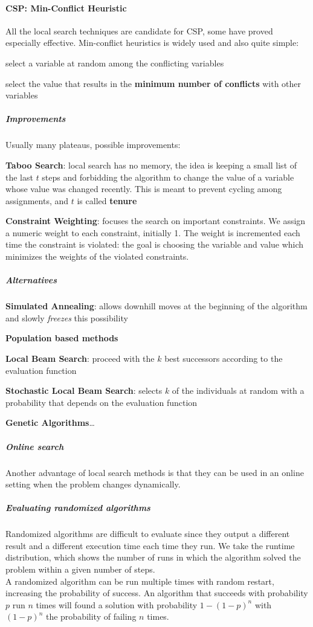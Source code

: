 \documentclass[10pt]{report}
\begin{document}
\paragraph{CSP: Min-Conflict Heuristic} All the local search techniques are candidate for CSP, some have proved especially effective. Min-conflict heuristics is widely used and also quite simple:
\begin{list}{}{}
	\item select a variable at random among the conflicting variables
	\item select the value that results in the \textbf{minimum number of conflicts} with other variables
\end{list}
\subparagraph{Improvements} Usually many plateaus, possible improvements:
\begin{list}{}{}
	\item \textbf{Taboo Search}: local search has no memory, the idea is keeping a small list of the last $t$ steps and forbidding the algorithm to change the value of a variable whose value was changed recently. This is meant to prevent cycling among assignments, and $t$ is called \textbf{tenure}
	\item \textbf{Constraint Weighting}: focuses the search on important constraints. We assign a numeric weight to each constraint, initially 1. The weight is incremented each time the constraint is violated: the goal is choosing the variable and value which minimizes the weights of the violated constraints.
\end{list}
\subparagraph{Alternatives}\begin{list}{}{}
	\item \textbf{Simulated Annealing}: allows downhill moves at the beginning of the algorithm and slowly \textit{freezes} this possibility
	\item \textbf{Population based methods}
	\begin{list}{}{}
		\item \textbf{Local Beam Search}: proceed with the $k$ best successors according to the evaluation function
		\item \textbf{Stochastic Local Beam Search}: selects $k$ of the individuals at random with a probability that depends on the evaluation function
		\item \textbf{Genetic Algorithms}\ldots
	\end{list}
\end{list}
\subparagraph{Online search} Another advantage of local search methods is that they can be used in an online setting when the problem changes dynamically.
\subparagraph{Evaluating randomized algorithms} Randomized algorithms are difficult to evaluate since they output a different result and a different execution time each time they run. We take the runtime distribution, which shows the number of runs in which the algorithm solved the problem within a given number of steps.\\
A randomized algorithm can be run multiple times with random restart, increasing the probability of success. An algorithm that succeeds with probability $p$ run $n$ times will found a solution with probability $1 - (1-p)^n$ with $(1-p)^n$ the probability of failing $n$ times.
\end{document}
